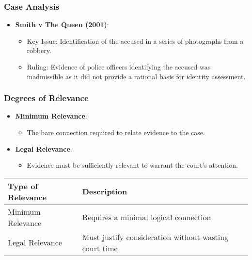 \subsubsection{Case Analysis}\label{case-analysis}

\begin{itemize}
\tightlist
\item
  \textbf{Smith v The Queen (2001)}:

  \begin{itemize}
  \tightlist
  \item
    Key Issue: Identification of the accused in a series of photographs
    from a robbery.
  \item
    Ruling: Evidence of police officers identifying the accused was
    inadmissible as it did not provide a rational basis for identity
    assessment.
  \end{itemize}
\end{itemize}

\subsubsection{Degrees of Relevance}\label{degrees-of-relevance}

\begin{itemize}
\tightlist
\item
  \textbf{Minimum Relevance}:

  \begin{itemize}
  \tightlist
  \item
    The bare connection required to relate evidence to the case.
  \end{itemize}
\item
  \textbf{Legal Relevance}:

  \begin{itemize}
  \tightlist
  \item
    Evidence must be sufficiently relevant to warrant the court's
    attention.
  \end{itemize}
\end{itemize}

\begin{longtable}[]{@{}
  >{\raggedright\arraybackslash}p{}
  >{\raggedright\arraybackslash}p{}@{}}
\toprule\noalign{}
\begin{minipage}[b]{\linewidth}\raggedright
\textbf{Type of Relevance}
\end{minipage} & \begin{minipage}[b]{\linewidth}\raggedright
\textbf{Description}
\end{minipage} \\
\midrule\noalign{}
\endhead
\bottomrule\noalign{}
\endlastfoot
Minimum Relevance & Requires a minimal logical connection \\
Legal Relevance & Must justify consideration without wasting court
time \\
\end{longtable}

